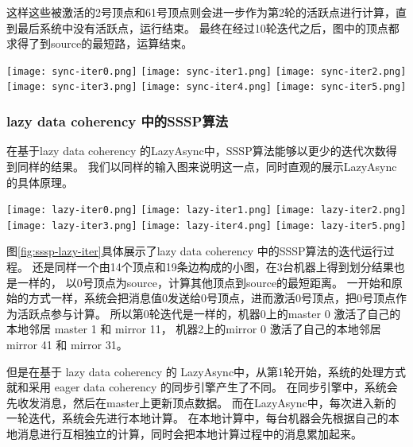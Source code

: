 这样这些被激活的2号顶点和61号顶点则会进一步作为第2轮的活跃点进行计算，直到最后系统中没有活跃点，运行结束。
最终在经过10轮迭代之后，图中的顶点都求得了到source的最短路，运算结束。


\begin{center}
  \texttt{[image: sync-iter0.png]}
  \texttt{[image: sync-iter1.png]}
  \texttt{[image: sync-iter2.png]}    
  \texttt{[image: sync-iter3.png]}    
  \texttt{[image: sync-iter4.png]}    
  \texttt{[image: sync-iter5.png]}    

  \label{fig:sssp-sync-iter}
\end{center}  

\subsubsection{lazy data coherency 中的SSSP算法}

在基于lazy data coherency 的LazyAsync中，SSSP算法能够以更少的迭代次数得到同样的结果。
我们以同样的输入图来说明这一点，同时直观的展示LazyAsync的具体原理。

\begin{center}
  \texttt{[image: lazy-iter0.png]}
  \texttt{[image: lazy-iter1.png]}
  \texttt{[image: lazy-iter2.png]}    
  \texttt{[image: lazy-iter3.png]}    
  \texttt{[image: lazy-iter4.png]}    
  \texttt{[image: lazy-iter5.png]}
  \label{fig:sssp-lazy-iter}
\end{center}  


图\ref{fig:sssp-lazy-iter}具体展示了lazy data coherency 中的SSSP算法的迭代运行过程。
还是同样一个由14个顶点和19条边构成的小图，在3台机器上得到划分结果也是一样的，
以0号顶点为source，计算其他顶点到source的最短距离。
一开始和原始的方式一样，系统会把消息值0发送给0号顶点，进而激活0号顶点，把0号顶点作为活跃点参与计算。  
所以第0轮迭代是一样的，机器0上的master 0 激活了自己的本地邻居 master 1 和 mirror 11，
机器2上的mirror 0 激活了自己的本地邻居mirror 41 和 mirror 31。

但是在基于 lazy data coherency 的 LazyAsync中，从第1轮开始，系统的处理方式就和采用 eager data coherency 的同步引擎产生了不同。
在同步引擎中，系统会先收发消息，然后在master上更新顶点数据。
而在LazyAsync中，每次进入新的一轮迭代，系统会先进行本地计算。
在本地计算中，每台机器会先根据自己的本地消息进行互相独立的计算，同时会把本地计算过程中的消息累加起来。

